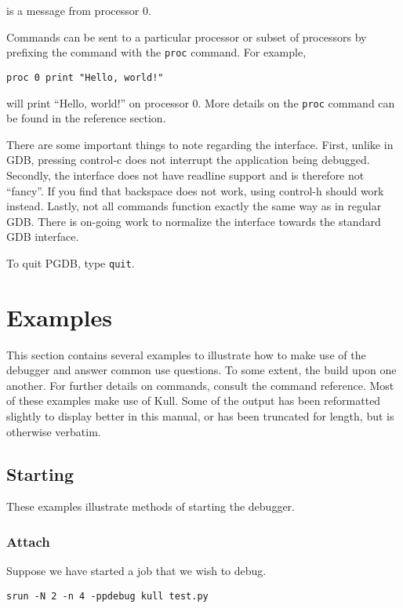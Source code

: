 \documentclass{refart}
\begin{document}
is a message from processor 0.

Commands can be sent to a particular processor or subset of processors by prefixing the command with the \texttt{proc} command. For example,

\begin{Verbatim}
proc 0 print "Hello, world!"
\end{Verbatim}

will print ``Hello, world!'' on processor 0. More details on the \texttt{proc} command can be found in the reference section.

There are some important things to note regarding the interface. First, unlike in GDB, pressing control-c does not interrupt the application being debugged. Secondly, the interface does not have readline support and is therefore not ``fancy''. If you find that backspace does not work, using control-h should work instead. Lastly, not all commands function exactly the same way as in regular GDB. There is on-going work to normalize the interface towards the standard GDB interface.

To quit PGDB, type \texttt{quit}.

\newpage

\section{Examples}

This section contains several examples to illustrate how to make use of the debugger and answer common use questions. To some extent, the build upon one another. For further details on commands, consult the command reference. Most of these examples make use of Kull. Some of the output has been reformatted slightly to display better in this manual, or has been truncated for length, but is otherwise verbatim.

\subsection{Starting}

These examples illustrate methods of starting the debugger.

\subsubsection{Attach}

Suppose we have started a job that we wish to debug.

\begin{Verbatim}
srun -N 2 -n 4 -ppdebug kull test.py
\end{Verbatim}
\end{document}
